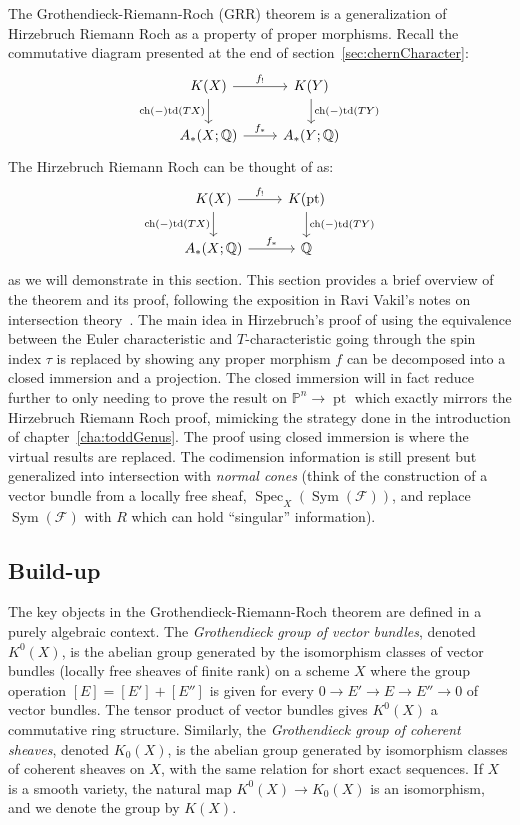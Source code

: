 \documentclass{ut-thesis}
\newcommand{\Q}{{\mathbb{Q}}}
\renewcommand{\P}{{\mathbb{P}}}
\newcommand{\CF}{{\mathcal{F}}}
\newcommand{\ch}{{\operatorname{ch}}}
\newcommand{\Sym}{\operatorname{Sym}}
\newcommand{\Spec}{{\operatorname{Spec}}}
\newcommand{\td}{{\operatorname{td}}}
\renewcommand{\ch}{{\operatorname{ch}}}
\begin{document}
The Grothendieck-Riemann-Roch (GRR) theorem is a generalization of Hirzebruch Riemann Roch as a property of
proper morphisms. Recall the commutative diagram presented at the end of section~\ref{sec:chernCharacter}:
\[
\begin{tikzcd}
K(X) \arrow[r, "f_!"] \arrow[d, "\ch(-)\td(TX)"'] & K(Y) \arrow[d, "\ch(-)\td(TY)"] \\
A_*(X; \Q) \arrow[r, "f_*"]             & A_*(Y; \Q)
\end{tikzcd}
\]
The Hirzebruch Riemann Roch can be thought of as:
\[
\begin{tikzcd}
  K(X) \arrow[r, "f_!"] \arrow[d, "\ch(-)\td(TX)"'] & K(\operatorname{pt}) \arrow[d, "\ch(-)\td(TY)"] \\
A_*(X; \Q) \arrow[r, "f_*"]             & \Q
\end{tikzcd}
\]
as we will demonstrate in this section. This section provides a brief overview of the theorem and its proof,
following the exposition in Ravi Vakil's notes on intersection theory~\cite{vakilIntersectionTheory}. The main
idea in Hirzebruch's proof of using the equivalence between the Euler characteristic and $T$-characteristic
going through the spin index $\tau$ is replaced by showing any proper morphism $f$ can be decomposed into a
closed immersion and a projection. The closed immersion will in fact reduce further to only needing to prove
the result on $\P^n \to \operatorname{pt}$ which exactly mirrors the Hirzebruch Riemann Roch proof, mimicking
the strategy done in the introduction of chapter~\cref{cha:toddGenus}. The proof using closed immersion is
where the virtual results are replaced. The codimension information is still present but generalized
into intersection with \emph{normal cones} (think of the construction of a vector bundle from a locally free
sheaf, $\Spec_X(\Sym(\CF))$, and replace $\Sym(\CF)$ with $R$ which can hold ``singular'' information).


\subsection*{Build-up}

The key objects in the Grothendieck-Riemann-Roch theorem are defined in a purely algebraic context. The
\emph{Grothendieck group of vector bundles}, denoted $K^0(X)$, is the abelian group generated by the
isomorphism classes of vector bundles (locally free sheaves of finite rank) on a scheme $X$ where the group
operation $[E] = [E'] + [E'']$ is given for every $0 \to E' \to E \to E'' \to 0$ of vector
bundles. The tensor product of vector bundles gives $K^0(X)$ a commutative ring structure. Similarly, the
\emph{Grothendieck group of coherent sheaves}, denoted $K_0(X)$, is the abelian group generated by
isomorphism classes of coherent sheaves on $X$, with the same relation for short exact sequences. If $X$ is a
smooth variety, the natural map $K^0(X) \to K_0(X)$ is an isomorphism, and we denote the group by $K(X)$.
\end{document}
